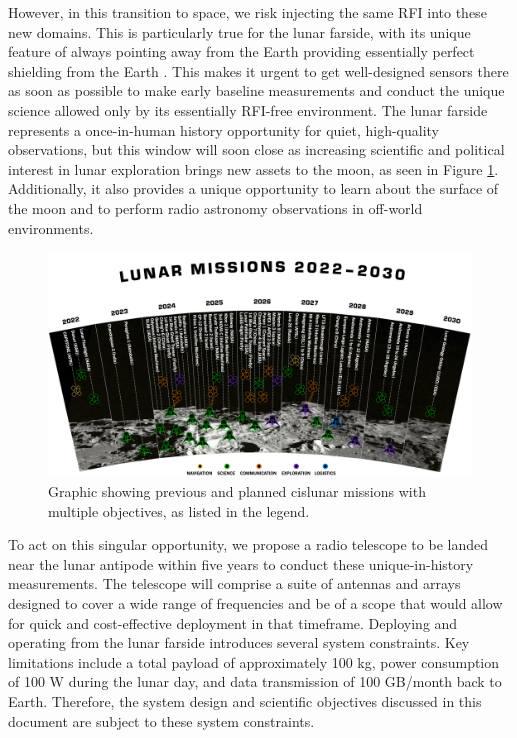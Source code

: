However, in this transition to space, we risk injecting the same RFI into these new domains.  This is particularly true for the lunar farside, with its unique feature of always pointing away from the Earth providing essentially perfect shielding from the Earth \citep{MACCONE2019233,michaud2020lunar,heidmann2002}.
This makes it urgent to get well-designed sensors there as soon as possible to make early baseline measurements and conduct the unique science allowed only by its essentially RFI-free environment. The lunar farside represents a once-in-human history opportunity for quiet, high-quality observations, but this window will soon close as increasing scientific and political interest in lunar exploration brings new assets to the moon, as seen in Figure \ref{fig:missions}. Additionally, it also provides a unique opportunity to learn about the surface of the moon and to perform radio astronomy observations in off-world environments. 

\begin{figure}
    \centering
    \includegraphics[width=\linewidth]{figures/missions.png}
    \caption{Graphic showing previous and planned cislunar missions with multiple objectives, as listed in the legend.    }
    \label{fig:missions}
\end{figure}

To act on this singular opportunity, we propose a radio telescope to be landed near the lunar antipode within five years to conduct these unique-in-history measurements. The telescope will comprise a suite of antennas and arrays designed to cover a wide range of frequencies and be of a scope that would allow for quick and cost-effective deployment in that timeframe.  Deploying and operating from the lunar farside introduces several system constraints. Key limitations include a total payload of approximately 100 kg, power consumption of 100 W during the lunar day, and data transmission of 100 GB/month back to Earth. Therefore, the system design and scientific objectives discussed in this document are subject to these system constraints.

